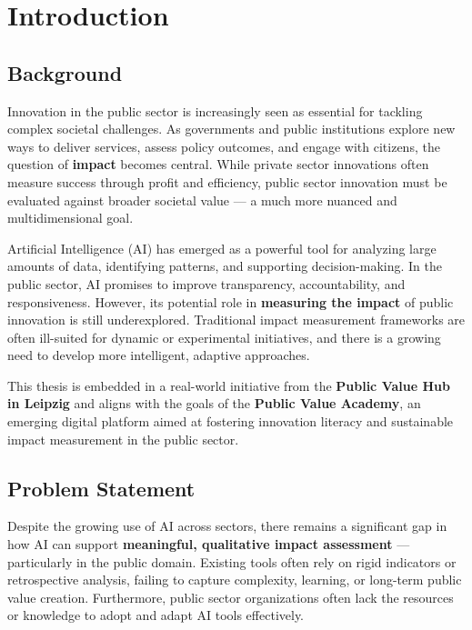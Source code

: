 
\chapter{Introduction}
\section{Background}

Innovation in the public sector is increasingly seen as essential for tackling complex societal challenges. As governments and public institutions explore new ways to deliver services, assess policy outcomes, and engage with citizens, the question of \textbf{impact} becomes central. While private sector innovations often measure success through profit and efficiency, public sector innovation must be evaluated against broader societal value — a much more nuanced and multidimensional goal.

Artificial Intelligence (AI) has emerged as a powerful tool for analyzing large amounts of data, identifying patterns, and supporting decision-making. In the public sector, AI promises to improve transparency, accountability, and responsiveness. However, its potential role in \textbf{measuring the impact} of public innovation is still underexplored. Traditional impact measurement frameworks are often ill-suited for dynamic or experimental initiatives, and there is a growing need to develop more intelligent, adaptive approaches.

This thesis is embedded in a real-world initiative from the \textbf{Public Value Hub in Leipzig} and aligns with the goals of the \textbf{Public Value Academy}, an emerging digital platform aimed at fostering innovation literacy and sustainable impact measurement in the public sector.

\section{Problem Statement}
Despite the growing use of AI across sectors, there remains a significant gap in how AI can support \textbf{meaningful, qualitative impact assessment} — particularly in the public domain. Existing tools often rely on rigid indicators or retrospective analysis, failing to capture complexity, learning, or long-term public value creation. Furthermore, public sector organizations often lack the resources or knowledge to adopt and adapt AI tools effectively.

